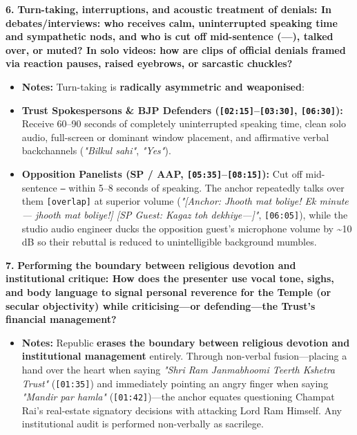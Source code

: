 \documentclass[10pt,a4paper]{article}
\begin{document}
\noindent\textbf{6.} \textbf{Turn-taking, interruptions, and acoustic treatment of denials: In debates/interviews: who receives calm, uninterrupted speaking time and sympathetic nods, and who is cut off mid-sentence (---), talked over, or muted? In solo videos: how are clips of official denials framed via reaction pauses, raised eyebrows, or sarcastic chuckles?}\par\smallskip
\begin{itemize}
  \item \textbf{Notes:}
Turn-taking is \textbf{radically asymmetric and weaponised}:\par\smallskip
  \item \textbf{Trust Spokespersons \& BJP Defenders (\texttt{[02:15]}--\texttt{[03:30]}, \texttt{[06:30]}):} Receive 60--90 seconds of completely uninterrupted speaking time, clean solo audio, full-screen or dominant window placement, and affirmative verbal backchannels (\textit{"Bilkul sahi"}, \textit{"Yes"}).
  \item \textbf{Opposition Panelists (SP / AAP, \texttt{[05:35]}--\texttt{[08:15]}):} Cut off mid-sentence \texttt{---} within 5--8 seconds of speaking. The anchor repeatedly talks over them \texttt{[overlap]} at superior volume (\textit{"[Anchor: Jhooth mat boliye! Ek minute--- jhooth mat boliye!] [SP Guest: Kagaz toh dekhiye---]"}, \texttt{[06:05]}), while the studio audio engineer ducks the opposition guest's microphone volume by \textasciitilde{}10 dB so their rebuttal is reduced to unintelligible background mumbles.
\end{itemize}

\noindent\textbf{7.} \textbf{Performing the boundary between religious devotion and institutional critique: How does the presenter use vocal tone, sighs, and body language to signal personal reverence for the Temple (or secular objectivity) while criticising---or defending---the Trust's financial management?}\par\smallskip
\begin{itemize}
  \item \textbf{Notes:}
Republic \textbf{erases the boundary between religious devotion and institutional management} entirely. Through non-verbal fusion---placing a hand over the heart when saying \textit{"Shri Ram Janmabhoomi Teerth Kshetra Trust"} (\texttt{[01:35]}) and immediately pointing an angry finger when saying \textit{"Mandir par hamla"} (\texttt{[01:42]})---the anchor equates questioning Champat Rai's real-estate signatory decisions with attacking Lord Ram Himself. Any institutional audit is performed non-verbally as sacrilege.\par\smallskip
\end{itemize}
\end{document}

